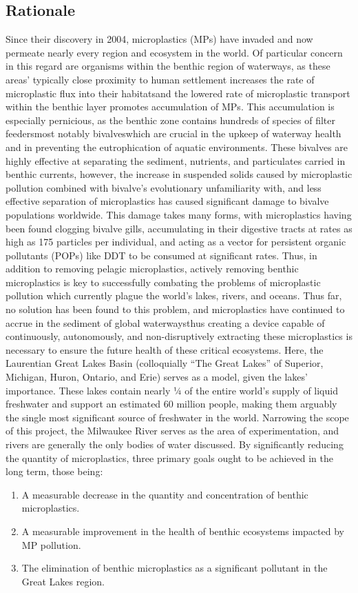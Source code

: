 \documentclass[fleqn,10pt]{SelfArx} %
\begin{document}
	\subsection{Rationale}
	Since their discovery in 2004, microplastics (MPs) have invaded and now permeate nearly every region and ecosystem in the world. Of particular concern in this regard are organisms within the benthic region of waterways, as these areas’ typically close proximity to human settlement increases the rate of microplastic flux into their habitats\textemdash and the lowered rate of microplastic transport within the benthic layer promotes accumulation of MPs. This accumulation is especially pernicious, as the benthic zone contains hundreds of species of filter feeders\textemdash most notably bivalves\textemdash which are crucial in the upkeep of waterway health and in preventing the eutrophication of aquatic environments. These bivalves are highly effective at separating the sediment, nutrients, and particulates carried in benthic currents, however, the increase in suspended solids caused by microplastic pollution combined with bivalve’s evolutionary unfamiliarity with, and less effective separation of microplastics has caused significant damage to bivalve populations worldwide. This damage takes many forms, with microplastics having been found clogging bivalve gills, accumulating in their digestive tracts at rates as high as 175 particles per individual, and acting as a vector for persistent organic pollutants (POPs) like DDT to be consumed at significant rates. Thus, in addition to removing pelagic microplastics, actively removing benthic microplastics is key to successfully combating the problems of microplastic pollution which currently plague the world’s lakes, rivers, and oceans. Thus far, no solution has been found to this problem, and microplastics have continued to accrue in the sediment of global waterways\textemdash thus creating a device capable of continuously, autonomously, and non-disruptively extracting these microplastics is necessary to ensure the future health of these critical ecosystems. Here, the Laurentian Great Lakes Basin (colloquially “The Great Lakes” of Superior, Michigan, Huron, Ontario, and Erie) serves as a model, given the lakes’ importance. These lakes contain nearly ¼ of the entire world’s supply of liquid freshwater and support an estimated 60 million people, making them arguably the single most significant source of freshwater in the world. Narrowing the scope of this project, the Milwaukee River serves as the area of experimentation, and rivers are generally the only bodies of water discussed. By significantly reducing the quantity of microplastics, three primary goals ought to be achieved in the long term, those being: 
	\begin{enumerate}
		\item A measurable decrease in the quantity and concentration of benthic microplastics.
		\item A measurable improvement in the health of benthic ecosystems impacted by MP pollution. 
		\item The elimination of benthic microplastics as a significant pollutant in the Great Lakes region.
		
	\end{enumerate}
	
\end{document}
